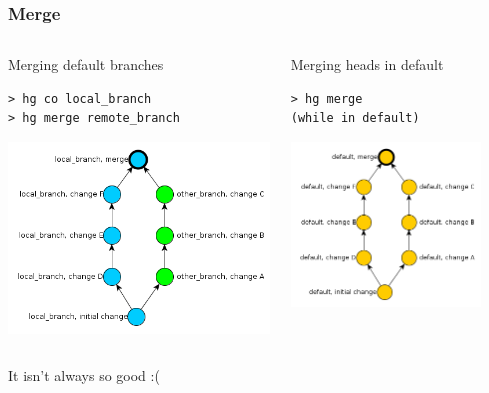 \documentclass{beamer}
\begin{document}
\begin{frame}[fragile]
\frametitle{Merge}
\begin{columns}[T]
\begin{column}{0.45\textwidth}
\begin{exampleblock}{Merging default branches}
\begin{verbatim}
> hg co local_branch
> hg merge remote_branch
\end{verbatim}
\end{exampleblock}
\includegraphics[width=\textwidth]{img/two_branches_merged}
\end{column}

\begin{column}{0.45\textwidth}
\begin{exampleblock}{Merging heads in default}
\begin{verbatim}
> hg merge 
(while in default)
\end{verbatim}
\end{exampleblock}
\includegraphics[width=0.86\textwidth]{img/two_default_branches_merged}
\end{column}
\end{columns}
\begin{center}
It isn't always so good :( 
\end{center}
\end{frame}
\end{document}
